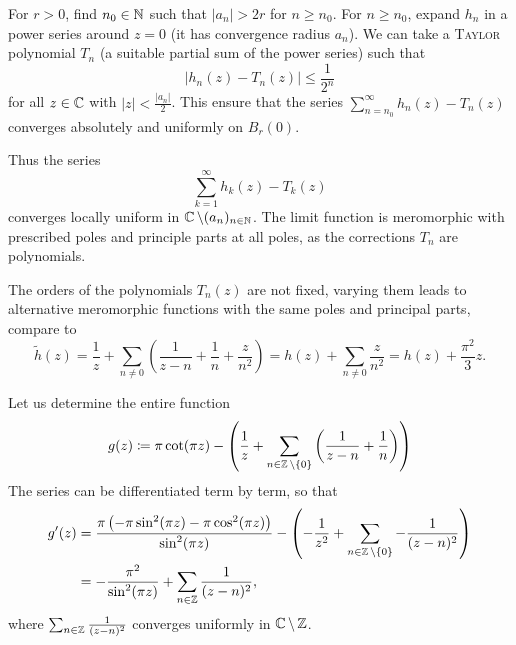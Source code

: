 \documentclass[a4paper,english]{article}
\begin{document}
\begin{pr}
    For $r > 0$, find $n_0 \in \operatorname{\mathbb{N}}$ such that $| a_n | > 2 r$ for $n \ge n_0$.
    For $n \ge n_0$, expand $h_n$ in a power series around $z = 0$ (it has convergence radius $a_n$).
    We can take a \textsc{Taylor} polynomial $T_n$ (a suitable partial sum of the power series) such that 
    \begin{equation*}
        | h_n(z) - T_n(z) |
        \le \frac{1}{2^n}
    \end{equation*}
    for all $z \in \operatorname{\mathbb{C}}$ with $| z | < \frac{| a_n |}{2}$.
    This ensure that the series $\sum_{n = n_0}^{\infty} h_n(z) - T_n(z)$ converges absolutely and uniformly on $B_r(0)$.
    
    Thus the series
    \begin{equation*}
        \sum_{k = 1}^{\infty} h_k(z) - T_k(z)
    \end{equation*}
    converges locally uniform in $\operatorname{\mathbb{C}} \setminus (a_n)_{n \in \operatorname{\mathbb{N}}}$.
    The limit function is meromorphic with prescribed poles and principle parts at all poles, as the corrections $T_n$ are polynomials.
\end{pr}

\begin{remark}
    The orders of the polynomials $T_n(z)$ are not fixed, varying them leads to alternative meromorphic functions with the same poles and principal parts, compare to
    \begin{equation*}
        \tilde{h}(z)
        = \frac{1}{z} + \sum_{n \ne 0} \left(\frac{1}{z - n} + \frac{1}{n} + \frac{z}{n^2}\right)
        = h(z) + \sum_{n \ne 0} \frac{z}{n^2}
        = h(z) + \frac{\pi^2}{3} z.
    \end{equation*}
\end{remark}


Let us determine the entire function
\begin{equation*}
    g(z)
    \coloneqq \pi \cot(\pi z) - \left( \frac{1}{z} + \sum_{n \in \operatorname{\mathbb{Z}} \setminus \{ 0 \}} \left( \frac{1}{z - n} + \frac{1}{n}\right) \right)
\end{equation*}
The series can be differentiated term by term, so that
\begin{align*}
    g'(z)
    & = \frac{\pi \left( - \pi \sin^2(\pi z) - \pi \cos^2(\pi z)\right)}{\sin^2(\pi z)} - \left(- \frac{1}{z^2} + \sum_{n \in \operatorname{\mathbb{Z}} \setminus \{ 0 \}} -\frac{1}{(z - n)^2}\right) \\
    & = - \frac{\pi^2}{\sin^2(\pi z)} + \sum_{n \in \operatorname{\mathbb{Z}}} \frac{1}{(z - n)^2},
\end{align*}
where $\sum_{n \in \operatorname{\mathbb{Z}}} \frac{1}{(z - n)^2}$ converges uniformly in $\operatorname{\mathbb{C}} \setminus \operatorname{\mathbb{Z}}$.
\end{document}
